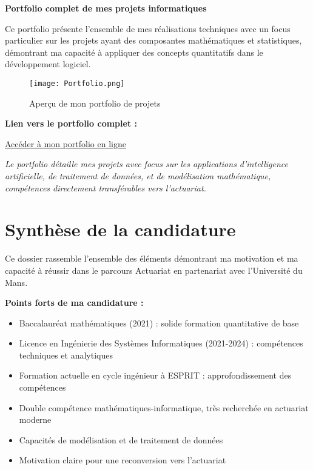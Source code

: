 \documentclass[12pt,a4paper]{article}
\begin{document}
\begin{itemize}
\textbf{Portfolio complet de mes projets informatiques}

Ce portfolio présente l'ensemble de mes réalisations techniques avec un focus particulier sur les projets ayant des composantes mathématiques et statistiques, démontrant ma capacité à appliquer des concepts quantitatifs dans le développement logiciel.

\begin{figure}[h]
    \centering
    \texttt{[image: Portfolio.png]}
    \caption{Aperçu de mon portfolio de projets}
    \label{fig:portfolio}
\end{figure}

\vspace{1cm}

\textbf{Lien vers le portfolio complet :}

\href{https://fediportfolio.netlify.app/}{Accéder à mon portfolio en ligne}

\textit{Le portfolio détaille mes projets avec focus sur les applications d'intelligence artificielle, de traitement de données, et de modélisation mathématique, compétences directement transférables vers l'actuariat.}

\newpage

\section{Synthèse de la candidature}
\label{sec:conclusion}

Ce dossier rassemble l'ensemble des éléments démontrant ma motivation et ma capacité à réussir dans le parcours Actuariat en partenariat avec l'Université du Mans.

\textbf{Points forts de ma candidature :}
\begin{itemize}
    \item Baccalauréat mathématiques (2021) : solide formation quantitative de base
    \item Licence en Ingénierie des Systèmes Informatiques (2021-2024) : compétences techniques et analytiques
    \item Formation actuelle en cycle ingénieur à ESPRIT : approfondissement des compétences
    \item Double compétence mathématiques-informatique, très recherchée en actuariat moderne
    \item Capacités de modélisation et de traitement de données
    \item Motivation claire pour une reconversion vers l'actuariat
\end{itemize}


\end{itemize}
\end{document}
